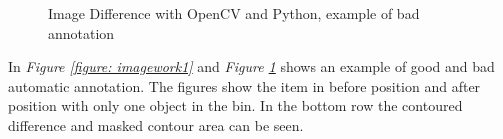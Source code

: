 \begin{figure}[ht]
    \centering
    \hspace{0.5cm}
    \hspace{0.5cm}
    \hspace{0.5cm}
    \caption{Image Difference with OpenCV and Python, example of bad annotation}
    \label{figure: imagework2}
\end{figure}

In \textit{Figure \ref{figure: imagework1}} and \textit{Figure \ref{figure: imagework2}} shows an example of good and bad automatic annotation. The figures show the item in before position and after position with only one object in the bin. In the bottom row the contoured difference and masked contour area can be seen.   

